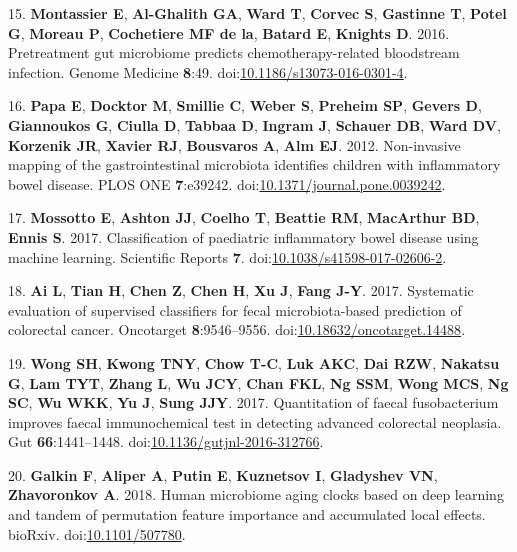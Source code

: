\documentclass[11pt,]{article}
\begin{document}
\hypertarget{ref-montassier_pretreatment_2016}{}
15. \textbf{Montassier E}, \textbf{Al-Ghalith GA}, \textbf{Ward T},
\textbf{Corvec S}, \textbf{Gastinne T}, \textbf{Potel G}, \textbf{Moreau
P}, \textbf{Cochetiere MF de la}, \textbf{Batard E}, \textbf{Knights D}.
2016. Pretreatment gut microbiome predicts chemotherapy-related
bloodstream infection. Genome Medicine \textbf{8}:49.
doi:\href{https://doi.org/10.1186/s13073-016-0301-4}{10.1186/s13073-016-0301-4}.

\hypertarget{ref-papa_non-invasive_2012}{}
16. \textbf{Papa E}, \textbf{Docktor M}, \textbf{Smillie C},
\textbf{Weber S}, \textbf{Preheim SP}, \textbf{Gevers D},
\textbf{Giannoukos G}, \textbf{Ciulla D}, \textbf{Tabbaa D},
\textbf{Ingram J}, \textbf{Schauer DB}, \textbf{Ward DV},
\textbf{Korzenik JR}, \textbf{Xavier RJ}, \textbf{Bousvaros A},
\textbf{Alm EJ}. 2012. Non-invasive mapping of the gastrointestinal
microbiota identifies children with inflammatory bowel disease. PLOS ONE
\textbf{7}:e39242.
doi:\href{https://doi.org/10.1371/journal.pone.0039242}{10.1371/journal.pone.0039242}.

\hypertarget{ref-mossotto_classification_2017}{}
17. \textbf{Mossotto E}, \textbf{Ashton JJ}, \textbf{Coelho T},
\textbf{Beattie RM}, \textbf{MacArthur BD}, \textbf{Ennis S}. 2017.
Classification of paediatric inflammatory bowel disease using machine
learning. Scientific Reports \textbf{7}.
doi:\href{https://doi.org/10.1038/s41598-017-02606-2}{10.1038/s41598-017-02606-2}.

\hypertarget{ref-ai_systematic_2017}{}
18. \textbf{Ai L}, \textbf{Tian H}, \textbf{Chen Z}, \textbf{Chen H},
\textbf{Xu J}, \textbf{Fang J-Y}. 2017. Systematic evaluation of
supervised classifiers for fecal microbiota-based prediction of
colorectal cancer. Oncotarget \textbf{8}:9546--9556.
doi:\href{https://doi.org/10.18632/oncotarget.14488}{10.18632/oncotarget.14488}.

\hypertarget{ref-wong_quantitation_2017}{}
19. \textbf{Wong SH}, \textbf{Kwong TNY}, \textbf{Chow T-C}, \textbf{Luk
AKC}, \textbf{Dai RZW}, \textbf{Nakatsu G}, \textbf{Lam TYT},
\textbf{Zhang L}, \textbf{Wu JCY}, \textbf{Chan FKL}, \textbf{Ng SSM},
\textbf{Wong MCS}, \textbf{Ng SC}, \textbf{Wu WKK}, \textbf{Yu J},
\textbf{Sung JJY}. 2017. Quantitation of faecal fusobacterium improves
faecal immunochemical test in detecting advanced colorectal neoplasia.
Gut \textbf{66}:1441--1448.
doi:\href{https://doi.org/10.1136/gutjnl-2016-312766}{10.1136/gutjnl-2016-312766}.

\hypertarget{ref-galkin_human_2018}{}
20. \textbf{Galkin F}, \textbf{Aliper A}, \textbf{Putin E},
\textbf{Kuznetsov I}, \textbf{Gladyshev VN}, \textbf{Zhavoronkov A}.
2018. Human microbiome aging clocks based on deep learning and tandem of
permutation feature importance and accumulated local effects. bioRxiv.
doi:\href{https://doi.org/10.1101/507780}{10.1101/507780}.
\end{document}
